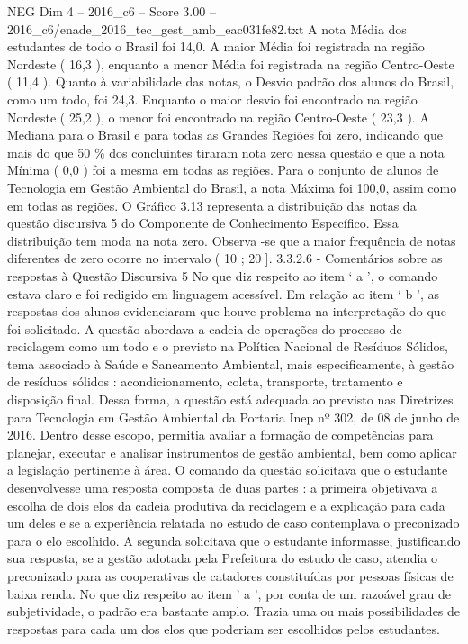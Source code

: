 \begin{textsample}{NEG Dim 4 – 2016\_c6 – Score 3.00 – 2016\_c6/enade\_2016\_tec\_gest\_amb\_eac031fe82.txt}
A nota Média dos estudantes de todo o Brasil foi 14,0.
A maior Média foi registrada na região Nordeste ( 16,3 ), enquanto a menor Média foi registrada na região Centro-Oeste ( 11,4 ).
Quanto à variabilidade das notas, o Desvio padrão dos alunos do Brasil, como um todo, foi 24,3.
Enquanto o maior desvio foi encontrado na região Nordeste ( 25,2 ), o menor foi encontrado na região Centro-Oeste ( 23,3 ).
A Mediana para o Brasil e para todas as Grandes Regiões foi zero, indicando que mais do que 50 \% dos concluintes tiraram nota zero nessa questão e que a nota Mínima ( 0,0 ) foi a mesma em todas as regiões.
Para o conjunto de alunos de Tecnologia em Gestão Ambiental do Brasil, a nota Máxima foi 100,0, assim como em todas as regiões.
O Gráfico 3.13 representa a distribuição das notas da questão discursiva 5 do Componente de Conhecimento Específico.
Essa distribuição tem moda na nota zero.
Observa -se que a maior frequência de notas diferentes de zero ocorre no intervalo ( 10 ; 20 ]. 3.3.2.6 - Comentários sobre as respostas à Questão Discursiva 5 No que diz respeito ao item ‘ a ’, o comando estava claro e foi redigido em linguagem acessível.
Em relação ao item ‘ b ’, as respostas dos alunos evidenciaram que houve problema na interpretação do que foi solicitado.
A questão abordava a cadeia de operações do processo de reciclagem como um todo e o previsto na Política Nacional de Resíduos Sólidos, tema associado à Saúde e Saneamento Ambiental, mais especificamente, à gestão de resíduos sólidos : acondicionamento, coleta, transporte, tratamento e disposição final.
Dessa forma, a questão está adequada ao previsto nas Diretrizes para Tecnologia em Gestão Ambiental da Portaria Inep nº 302, de 08 de junho de 2016.
Dentro desse escopo, permitia avaliar a formação de competências para planejar, executar e analisar instrumentos de gestão ambiental, bem como aplicar a legislação pertinente à área.
O comando da questão solicitava que o estudante desenvolvesse uma resposta composta de duas partes : a primeira objetivava a escolha de dois elos da cadeia produtiva da reciclagem e a explicação para cada um deles e se a experiência relatada no estudo de caso contemplava o preconizado para o elo escolhido.
A segunda solicitava que o estudante informasse, justificando sua resposta, se a gestão adotada pela Prefeitura do estudo de caso, atendia o preconizado para as cooperativas de catadores constituídas por pessoas físicas de baixa renda.
No que diz respeito ao item ’ a ’, por conta de um razoável grau de subjetividade, o padrão era bastante amplo.
Trazia uma ou mais possibilidades de respostas para cada um dos elos que poderiam ser escolhidos pelos estudantes.

\end{textsample}
